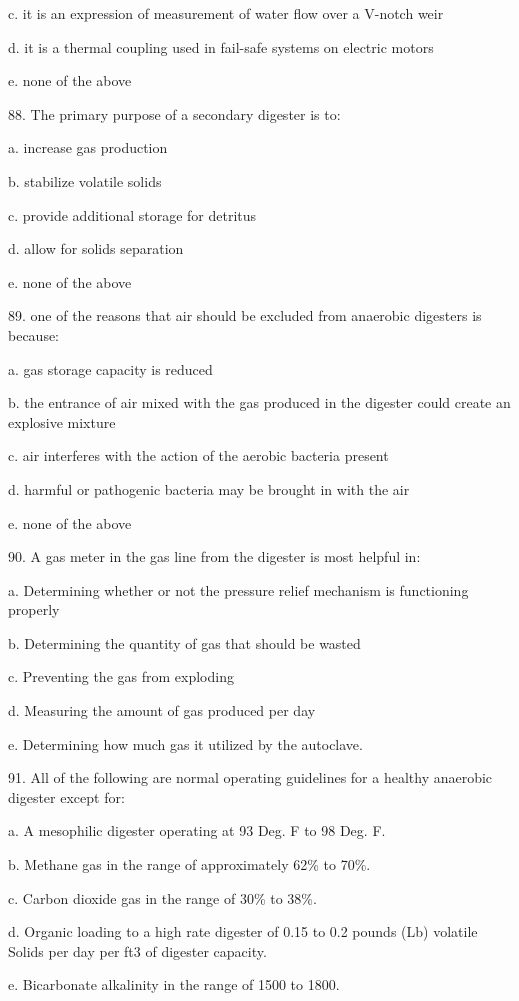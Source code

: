\documentclass{article}
\begin{document}
c. it is an expression of measurement of water flow over a V-notch weir 

d. it is a thermal coupling used in fail-safe systems on electric motors 

e. none of the above 


88. The primary purpose of a secondary digester is to: 

a. increase gas production 

b. stabilize volatile solids 

c. provide additional storage for detritus 

d. allow for solids separation 

e. none of the above 


89. one of the reasons that air should be excluded from anaerobic digesters is because: 

a. gas storage capacity is reduced 

b. the entrance of air mixed with the gas produced in the digester could create an explosive mixture 

c. air interferes with the action of the aerobic bacteria present 

d. harmful or pathogenic bacteria may be brought in with the air 

e. none of the above 


90. A gas meter in the gas line from the digester is most helpful in: 

a. Determining whether or not the pressure relief mechanism is functioning properly 

b. Determining the quantity of gas that should be wasted 

c. Preventing the gas from exploding 

d. Measuring the amount of gas produced per day 

e. Determining how much gas it utilized by the autoclave. 


91. All of the following are normal operating guidelines for a healthy anaerobic digester except for: 

a. A mesophilic digester operating at 93 Deg. F to 98 Deg. F. 

b. Methane gas in the range of approximately 62\% to 70\%. 

c. Carbon dioxide gas in the range of 30\% to 38\%. 

d. Organic loading to a high rate digester of 0.15 to 0.2 pounds (Lb) volatile Solids per day per ft3 of digester capacity. 

e. Bicarbonate alkalinity in the range of 1500 to 1800. 
\end{document}
